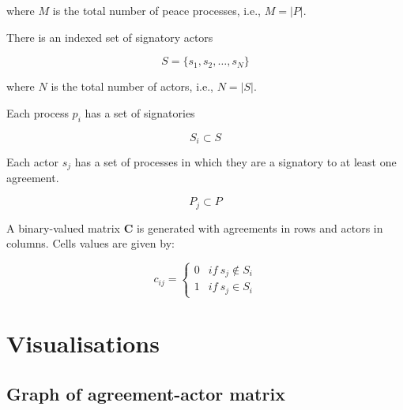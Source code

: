 \documentclass{article}
\begin{document}
where $M$ is the total number of peace processes, i.e., $M=|P|$.\newline

There is an indexed set of signatory actors

\begin{equation}
S=\{s_1,s_2,…,s_N\} 
\end{equation}

where $N$ is the total number of actors, i.e., $N=|S|$.\newline

Each process $p_i$ has a set of signatories 

\begin{equation}
S_{i}\subset S
\end{equation}

Each actor $s_j$ has a set of processes in which they are a signatory to at least one agreement.

\begin{equation}
P_{j}\subset P
\end{equation}

A binary-valued matrix $\bm{C}$ is generated with agreements in rows and actors in columns. Cells values are given by:

\begin{equation}
c_{ij} =
\begin{cases}
0& if \ s_j \notin S_{i}\\
1 & if \ s_j \in S_{i}
\end{cases}
\end{equation}

\appendix

\section{Visualisations}

\subsection{Graph of agreement-actor matrix}
\end{document}
